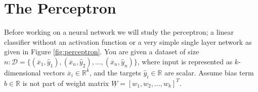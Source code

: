 \documentclass[a4paper,12pt]{article} %
\begin{document}
	\thispagestyle{empty}  
	\vspace{0.4cm}
	
	
	\section{The Perceptron}
	Before working on a neural network we will study the perceptron; a linear 
	classifier
	without an activation function or a very simple single layer network as 
	given in Figure \ref{fig:perceptron}.
	You are given a dataset of size $n: \mathcal{D} = \{(\overline{x}_1 
	,\hat{y}_1),(\overline{x}_n ,\hat{y}_2),\dots , (\overline{x}_n 
	,\hat{y}_n)\}$, where input is represented as $k$-dimensional vectors 
	$\overline{x}_i \in \mathbb{R}^k$, and the targets $\hat{y}_i \in 
	\mathbb{R}$ are scalar. Assume bias term $b \in \mathbb{R}$ is not part of 
	weight matrix $\underline{W} = [w_1,w_2,\dots,w_k]^T$.
	
\end{document}
